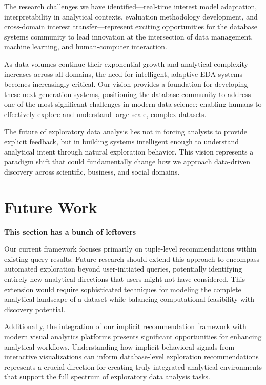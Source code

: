 \documentclass[sigconf, nonacm]{acmart}
\begin{document}
The research challenges we have identified—real-time interest model adaptation, interpretability in analytical contexts, evaluation methodology development, and cross-domain interest transfer—represent exciting opportunities for the database systems community to lead innovation at the intersection of data management, machine learning, and human-computer interaction.

As data volumes continue their exponential growth and analytical complexity increases across all domains, the need for intelligent, adaptive EDA systems becomes increasingly critical. Our vision provides a foundation for developing these next-generation systems, positioning the database community to address one of the most significant challenges in modern data science: enabling humans to effectively explore and understand large-scale, complex datasets.

The future of exploratory data analysis lies not in forcing analysts to provide explicit feedback, but in building systems intelligent enough to understand analytical intent through natural exploration behavior. This vision represents a paradigm shift that could fundamentally change how we approach data-driven discovery across scientific, business, and social domains.

\section{Future Work}

\textbf{This section has a bunch of leftovers}

Our current framework focuses primarily on tuple-level recommendations within existing query results. Future research should extend this approach to encompass automated exploration beyond user-initiated queries, potentially identifying entirely new analytical directions that users might not have considered. This extension would require sophisticated techniques for modeling the complete analytical landscape of a dataset while balancing computational feasibility with discovery potential.

Additionally, the integration of our implicit recommendation framework with modern visual analytics platforms presents significant opportunities for enhancing analytical workflows. Understanding how implicit behavioral signals from interactive visualizations can inform database-level exploration recommendations represents a crucial direction for creating truly integrated analytical environments that support the full spectrum of exploratory data analysis tasks.
\end{document}
